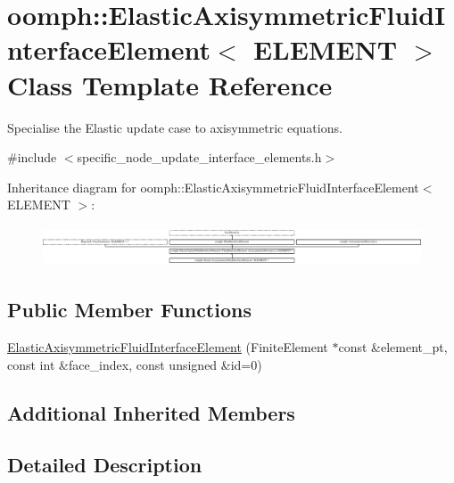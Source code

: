 \hypertarget{classoomph_1_1ElasticAxisymmetricFluidInterfaceElement}{}\section{oomph\+:\+:Elastic\+Axisymmetric\+Fluid\+Interface\+Element$<$ E\+L\+E\+M\+E\+NT $>$ Class Template Reference}
\label{classoomph_1_1ElasticAxisymmetricFluidInterfaceElement}


Specialise the Elastic update case to axisymmetric equations.  




{\ttfamily \#include $<$specific\+\_\+node\+\_\+update\+\_\+interface\+\_\+elements.\+h$>$}

Inheritance diagram for oomph\+:\+:Elastic\+Axisymmetric\+Fluid\+Interface\+Element$<$ E\+L\+E\+M\+E\+NT $>$\+:\begin{figure}[H]
\begin{center}
\leavevmode
\includegraphics[height=1.202362cm]{classoomph_1_1ElasticAxisymmetricFluidInterfaceElement}
\end{center}
\end{figure}
\subsection*{Public Member Functions}
\begin{DoxyCompactItemize}
\item 
\hyperlink{classoomph_1_1ElasticAxisymmetricFluidInterfaceElement_a9cb419f11aa4504bca4b6a9c40cca505}{Elastic\+Axisymmetric\+Fluid\+Interface\+Element} (Finite\+Element $\ast$const \&element\+\_\+pt, const int \&face\+\_\+index, const unsigned \&id=0)
\end{DoxyCompactItemize}
\subsection*{Additional Inherited Members}


\subsection{Detailed Description}
